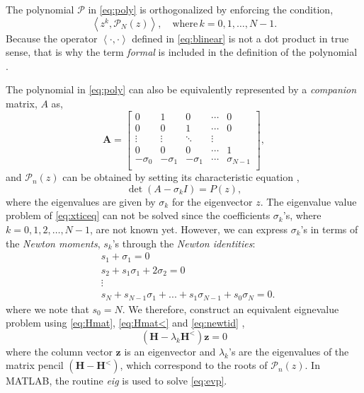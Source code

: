 \documentclass[12pt]{article}
\begin{document}
The polynomial $\mathcal P$ in \eqref{eq:poly} is orthogonalized by enforcing the condition,
%
\begin{equation}
  \left \langle z^k, \mathcal {P}_N(z) \right \rangle, \quad \text{where} \, k = 0,1,\dots,N-1.
  \label{eq:orthogonalzie}
\end{equation}
%
Because the operator $\left \langle \cdot, \cdot \right \rangle$ defined in \eqref{eq:blinear} is not a dot product in true sense, that is why the term \emph{formal} is included in the definition of the polynomial \cite{Kravanja1999}.
%

The polynomial in \eqref{eq:poly} can also be equivalently represented by a \emph{companion} matrix, $A$ as,
%
\begin{equation}
  \mathbf A =
  \begin{bmatrix}
    0 & 1 & 0 & \cdots & 0 \\
    0 & 0 & 1 & \cdots & 0 \\
    \vdots & \vdots & \ddots & \vdots \\
    0 & 0 & 0 & \cdots & 1 \\
    -\sigma_0 & -\sigma_1 & -\sigma_1 & \cdots & \sigma_{N-1} \\
  \end{bmatrix},
  \label{eq:A}
\end{equation}
%
and $\mathcal P_n(z)$ can be obtained by setting its characteristic equation \cite{Gentle1998},
%
\begin{equation}
  \det( A - \sigma_k I) = P(z),
  \label{eq:xticeq}
\end{equation}
%
where the eigenvalues are given by $\sigma_k$ for the eigenvector $z$. The eigenvalue value problem of \eqref{eq:xticeq} can not be solved since the coefficients $\sigma_k$'s, where $k = 0, 1, 2, \dots, N-1 $, are not known yet. However, we can express $\sigma_k$'s in terms of the \emph{Newton moments}, $s_k$'s through the \emph{Newton identities}:
%
\begin{equation}
  \begin{aligned}
    & s_1 + \sigma_1 = 0 \\
    &  s_2 + s_1 \sigma_1 + 2 \sigma_2 = 0 \\
    &  {\vdots}\\
    &  s_N + s_{N-1} \sigma_{1} + ... + s_1 \sigma_{N-1} + s_0 \sigma_N = 0.
    \label{eq:newtid}
  \end{aligned}
\end{equation}
%
where we note that $s_0 = N$. We therefore, construct an equivalent eignevalue problem using \eqref{eq:Hmat}, \eqref{eq:Hmat<} and \eqref{eq:newtid} \cite{Gillan2006c},
%
\begin{equation}
  \left( \mathbf H - \lambda_k \mathbf H^< \right) \mathbf z = 0
  \label{eq:evp}
\end{equation}
%
where the column vector $\mathbf{z}$ is an eigenvector and $\lambda_k$'s are the eigenvalues of the matrix pencil $(\mathbf H - \mathbf H^< )$, which correspond to the roots of $\mathcal P_n(z)$. In {MATLAB}, the routine \emph{eig} is used to solve \eqref{eq:evp}.
\end{document}
